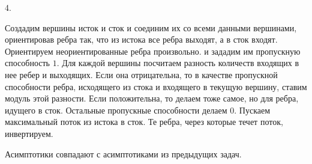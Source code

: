 4.

Создадим вершины исток и сток и соединим их со всеми данными вершинами, ориентировав ребра так, что из истока все ребра выходят, а в сток входят. Ориентируем неориентированные ребра произвольно. и зададим им пропускную способность $1$. Для каждой вершины посчитаем разность количеств входящих в нее ребер и выходящих. Если она отрицательна, то в качестве пропускной способности ребра, исходящего из стока и входящего в текущую вершину, ставим модуль этой разности. Если положительна, то делаем тоже самое, но для ребра, идущего в сток. Остальные пропускные способности делаем $0$. Пускаем максимальный поток из истока в сток. Те ребра, через которые течет поток, инвертируем.

Асимптотики совпадают с асимптотиками из предыдущих задач.